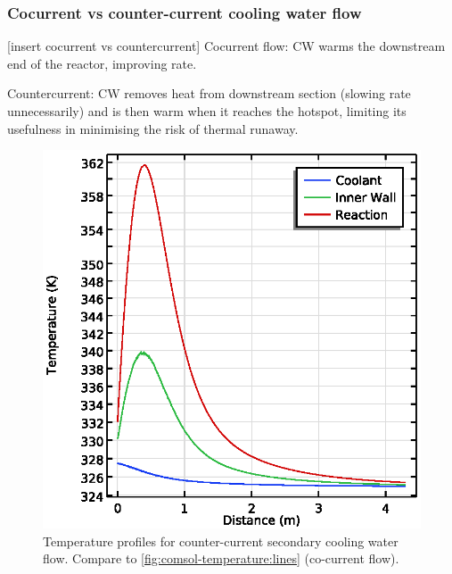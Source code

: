 \subsubsection{Cocurrent vs counter-current cooling water flow}
[insert cocurrent vs countercurrent]
Cocurrent flow: CW warms the downstream end of the reactor, improving rate.

Countercurrent: CW removes heat from downstream section (slowing rate unnecessarily) and is then warm when it reaches the hotspot, limiting its usefulness in minimising the risk of thermal runaway.

\begin{figure}[h]
    \centering
    \begin{minipage}[t]{0.47\linewidth}
        \includegraphics[width=\linewidth]{figures/temperature-lines-countercurrent.eps}
        \caption{Temperature profiles for counter-current secondary cooling water flow. Compare to \cref{fig:comsol-temperature:lines} (co-current flow).}
        \label{fig:comsol-temperature:lines:countercurrent}
    \end{minipage}\hfill
    \begin{minipage}[t]{0.47\linewidth}

\end{minipage}
\end{figure}
